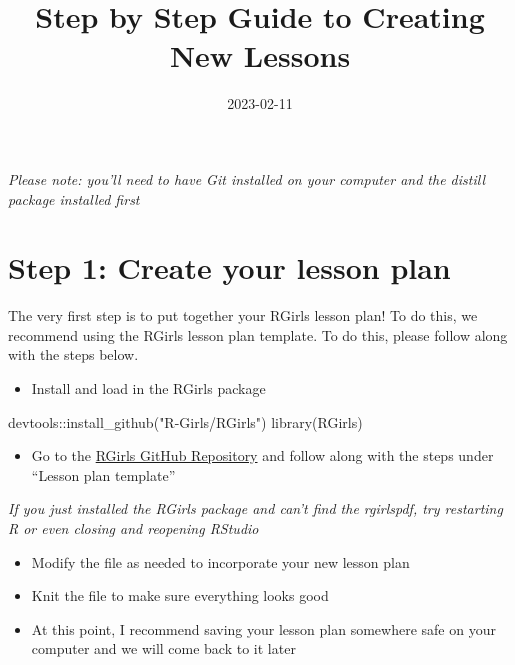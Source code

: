 \documentclass[
]{article}
\title{Step by Step Guide to Creating New Lessons}
\author{}
\date{\vspace{-2.5em}2023-02-11}
\newenvironment{Shaded}{\begin{snugshade}}{\end{snugshade}}
\newcommand{\FunctionTok}[1]{\textcolor[rgb]{0.00,0.00,0.00}{#1}}
\newcommand{\NormalTok}[1]{#1}
\newcommand{\SpecialCharTok}[1]{\textcolor[rgb]{0.00,0.00,0.00}{#1}}
\newcommand{\StringTok}[1]{\textcolor[rgb]{0.31,0.60,0.02}{#1}}
\providecommand{\tightlist}{%
  \setlength{\itemsep}{0pt}\setlength{\parskip}{0pt}}
\begin{document}
\maketitle

\emph{Please note: you'll need to have Git installed on your computer
and the distill package installed first}

\hypertarget{step-1-create-your-lesson-plan}{%
\section{Step 1: Create your lesson
plan}\label{step-1-create-your-lesson-plan}}

The very first step is to put together your RGirls lesson plan! To do
this, we recommend using the RGirls lesson plan template. To do this,
please follow along with the steps below.

\begin{itemize}
\tightlist
\item
  Install and load in the RGirls package
\end{itemize}

\begin{Shaded}
\begin{Highlighting}[]
\NormalTok{devtools}\SpecialCharTok{::}\FunctionTok{install\_github}\NormalTok{(}\StringTok{"R{-}Girls/RGirls"}\NormalTok{)}
\FunctionTok{library}\NormalTok{(RGirls)}
\end{Highlighting}
\end{Shaded}

\begin{itemize}
\tightlist
\item
  Go to the \href{https://github.com/R-Girls/RGirls}{RGirls GitHub
  Repository} and follow along with the steps under ``Lesson plan
  template''
\end{itemize}

\emph{If you just installed the RGirls package and can't find the
rgirlspdf, try restarting R or even closing and reopening RStudio}

\begin{itemize}
\item
  Modify the file as needed to incorporate your new lesson plan
\item
  Knit the file to make sure everything looks good
\item
  At this point, I recommend saving your lesson plan somewhere safe on
  your computer and we will come back to it later
\end{itemize}
\end{document}
